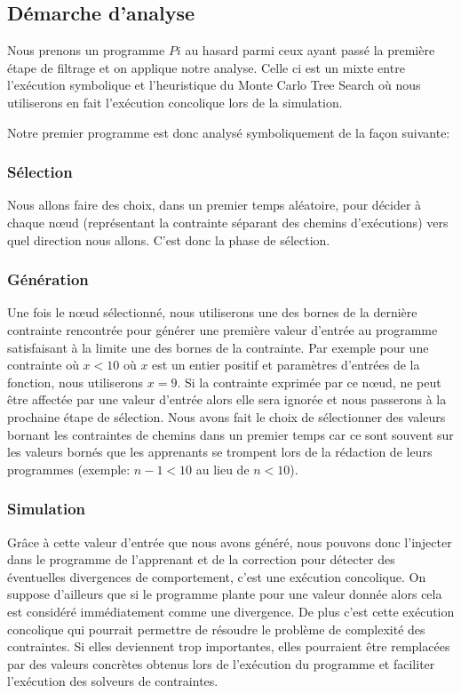 \subsection*{Démarche d'analyse}
Nous prenons un programme $Pi$ au hasard parmi ceux ayant passé la première étape de filtrage et on applique notre analyse. Celle ci est un mixte entre l'exécution symbolique et l'heuristique du Monte Carlo Tree Search où nous utiliserons en fait l'exécution concolique lors de la simulation.

Notre premier programme est donc analysé symboliquement de la façon suivante:

\subsubsection*{Sélection}
Nous allons faire des choix, dans un premier temps aléatoire, pour décider à chaque nœud (représentant la contrainte séparant des chemins d'exécutions) vers quel direction nous allons. C'est donc la phase de sélection.

\subsubsection*{Génération}
Une fois le nœud sélectionné, nous utiliserons une des bornes de la dernière contrainte rencontrée pour générer une première valeur d'entrée au programme satisfaisant à la limite une des bornes de la contrainte. 
Par exemple pour une contrainte où $x < 10$ où $x$ est un entier positif et paramètres d'entrées de la fonction, nous utiliserons $x = 9$. Si la contrainte exprimée par ce nœud, ne peut être affectée par une valeur d'entrée alors elle sera ignorée et nous passerons à la prochaine étape de sélection.
Nous avons fait le choix de sélectionner des valeurs bornant les contraintes de chemins dans un premier temps car ce sont souvent sur les valeurs bornés que les apprenants se trompent lors de la rédaction de leurs programmes (exemple: $n-1 < 10$ au lieu de $n < 10$).

\subsubsection*{Simulation}
Grâce à cette valeur d'entrée que nous avons généré, nous pouvons donc l'injecter dans le programme de l'apprenant et de la correction pour détecter des éventuelles divergences de comportement, c'est une exécution concolique. On suppose d'ailleurs que si le programme plante pour une valeur donnée alors cela est considéré immédiatement comme une divergence.
De plus c'est cette exécution concolique qui pourrait permettre de résoudre le problème de complexité des contraintes. Si elles deviennent trop importantes, elles pourraient être remplacées par des valeurs concrètes obtenus lors de l'exécution du programme et faciliter l'exécution des solveurs de contraintes.

